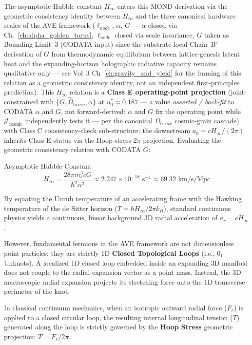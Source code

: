 The asymptotic Hubble constant $H_\infty$ enters this MOND derivation via the geometric consistency identity between $H_\infty$ and the three canonical hardware scales of the AVE framework ($\ell_{node}$, $\alpha$, $G$ --- $\alpha$ closed via Ch.~\ref{ch:alpha_golden_torus}, $\ell_{node}$ closed via scale invariance, $G$ taken as Bounding Limit~3 (CODATA input) since the substrate-local Chain~B$'$ derivation of $G$ from thermodynamic equilibrium between lattice-genesis latent heat and the expanding-horizon holographic radiative capacity remains qualitative only --- see Vol~3 Ch~\ref{ch:gravity_and_yield} for the framing of this relation as a geometric consistency identity, not an independent first-principles prediction).
This $H_\infty$ relation is a \textbf{Class E operating-point projection} (joint-constrained with $\{G, \hat{\Omega}_{\text{freeze}}, \alpha\}$ at $u_0^* \approx 0.187$ --- a value \emph{asserted / back-fit} to CODATA $\alpha$ and $G$, not forward-derived; $\alpha$ and $G$ fix the operating point while $\mathcal{J}_{\text{cosmic}}$ independently tests it --- per the canonical $\Omega_\text{freeze}$ cosmic-grain cascade) with Class C consistency-check sub-structure; the downstream $a_0 = c H_\infty/(2\pi)$ inherits Class E status via the Hoop-stress $2\pi$ projection. Evaluating the geometric consistency relation with CODATA $G$:
\begin{resultbox}{Asymptotic Hubble Constant}
\begin{equation}
    H_\infty = \frac{28\pi m_e^3 c G}{\hbar^2 \alpha^2} \approx 2.247 \times 10^{-18} \text{ s}^{-1} \approx 69.32 \text{ km/s/Mpc}
    \label{eq:H_infinity}
\end{equation}
\end{resultbox}

By equating the Unruh temperature of an accelerating frame with the Hawking temperature of the de Sitter horizon ($T=\hbar H_{\infty}/2\pi k_{B}$), standard continuous physics yields a continuous, linear background 3D radial acceleration of $a_r = c H_{\infty}$.

However, fundamental fermions in the AVE framework are not dimensionless point particles;
they are strictly 1D \textbf{Closed Topological Loops} (i.e., $0_{1}$ Unknots). A localized 1D closed loop embedded inside an expanding 3D manifold does not couple to the radial expansion vector as a point mass. Instead, the 3D macroscopic radial expansion projects its stretching force onto the 1D transverse perimeter of the knot.

In classical continuum mechanics, when an isotropic outward radial force ($F_r$) is applied to a closed circular loop, the resulting internal longitudinal tension ($T$) generated along the loop is strictly governed by the \textbf{Hoop Stress} geometric projection: $T = F_r / 2\pi$.

